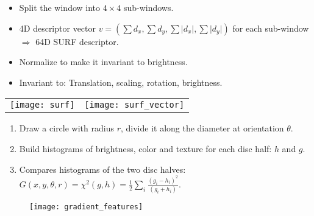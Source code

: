 \documentclass[11pt, a4paper, landscape]{article}
\begin{document}
\NewPage{}
\vfill
\begin{itemize}
\item Split the window into $4 \times 4$ sub-windows.
\item 4D descriptor vector $v = (\sum d_x, \sum d_y, \sum \lvert d_x \rvert, \sum \lvert d_y \rvert)$ for each sub-window\\
$\Rightarrow$ 64D SURF descriptor.
\item Normalize to make it invariant to brightness.
\item Invariant to: Translation, scaling, rotation, brightness.
\end{itemize}
\begin{table}
  \centering
  \begin{tabular}{@{} M{.5\linewidth} M{.5\linewidth} @{}}
      \texttt{[image: surf]}
      &
      \texttt{[image: surf\_vector]}%
  \end{tabular}
\end{table}
\vfill





\NewPage{}
\small
\vfill
\begin{enumerate}
\item Draw a circle with radius $r$, divide it along the diameter at orientation $\theta$.
\item Build histograms of brightness, color and texture for each disc half: $h$ and $g$.
\item Compares histograms of the two disc halves: $G(x, y, \theta, r) = \chi ^ 2 (g, h) = \frac{1}{2} \sum_i \frac{(g_i - h_i)^2}{(g_i + h_i)}$.
\end{enumerate}
\begin{figure}
	\centering
	\texttt{[image: gradient\_features]}
\end{figure}
\vfill
\end{document}
